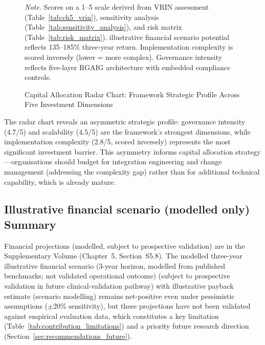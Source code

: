\begin{figure}[!htbp]
\caption[Capital Allocation Radar Chart]{Capital Allocation Radar Chart: Framework Strategic Profile Across Five Investment Dimensions}
\vspace{0.5em}\noindent\textit{Note.} Scores on a 1--5 scale derived from VRIN assessment (Table~\ref{tab:ch5_vrin}), sensitivity analysis (Table~\ref{tab:sensitivity_analysis}), and risk matrix (Table~\ref{tab:risk_matrix}). illustrative financial scenario potential reflects 135--185\% three-year return. Implementation complexity is scored inversely (lower = more complex). Governance intensity reflects five-layer RGAIG architecture with embedded compliance controls.
\end{figure}

\noindent The radar chart reveals an asymmetric strategic profile: governance intensity (4.7/5) and scalability (4.5/5) are the framework's strongest dimensions, while implementation complexity (2.8/5, scored inversely) represents the most significant investment barrier. This asymmetry informs capital allocation strategy---organisations should budget for integration engineering and change management (addressing the complexity gap) rather than for additional technical capability, which is already mature.
\fi

\subsection{Illustrative financial scenario (modelled only) Summary}

Financial projections (modelled, subject to prospective validation) are in the Supplementary Volume (Chapter~5, Section~S5.8). The modelled three-year illustrative financial scenario (3-year horizon, modelled from published benchmarks; not validated operational outcome) (subject to prospective validation in future clinical-validation pathway) with illustrative payback estimate (scenario modelling) remains net-positive even under pessimistic assumptions ($\pm$20\% sensitivity), but these projections have not been validated against empirical evaluation data, which constitutes a key limitation (Table~\ref{tab:contribution_limitations}) and a priority future research direction (Section~\ref{sec:recommendations_future}).

